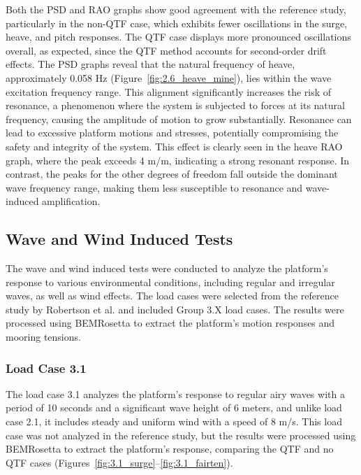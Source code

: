 \documentclass[a4paper, 11pt]{article}
\begin{document}
Both the PSD and RAO graphs show good agreement with the reference study, particularly in the non-QTF case, which exhibits fewer oscillations in the surge, heave, and pitch responses. The QTF case displays more pronounced oscillations overall, as expected, since the QTF method accounts for second-order drift effects. The PSD graphs reveal that the natural frequency of heave, approximately 0.058 Hz (Figure~\ref{fig:2.6_heave_mine}), lies within the wave excitation frequency range. This alignment significantly increases the risk of resonance, a phenomenon where the system is subjected to forces at its natural frequency, causing the amplitude of motion to grow substantially. Resonance can lead to excessive platform motions and stresses, potentially compromising the safety and integrity of the system. This effect is clearly seen in the heave RAO graph, where the peak exceeds 4 m/m, indicating a strong resonant response. In contrast, the peaks for the other degrees of freedom fall outside the dominant wave frequency range, making them less susceptible to resonance and wave-induced amplification.

\subsection{Wave and Wind Induced Tests}
\hspace*{0.5cm}The wave and wind induced tests were conducted to analyze the platform's response to various environmental conditions, including regular and irregular waves, as well as wind effects. The load cases were selected from the reference study by Robertson et al. \cite{Robertson2014} and included Group 3.X load cases. The results were processed using BEMRosetta to extract the platform's motion responses and mooring tensions.

\subsubsection{Load Case 3.1}
\hspace*{0.5cm}The load case 3.1 analyzes the platform’s response to regular airy waves with a period of 10 seconds and a significant wave height of 6 meters, and unlike load case 2.1, it includes steady and uniform wind with a speed of 8 m/s. This load case was not analyzed in the reference study, but the results were processed using BEMRosetta to extract the platform’s response, comparing the QTF and no QTF cases (Figures~\ref{fig:3.1_surge}--\ref{fig:3.1_fairten}).
\end{document}
